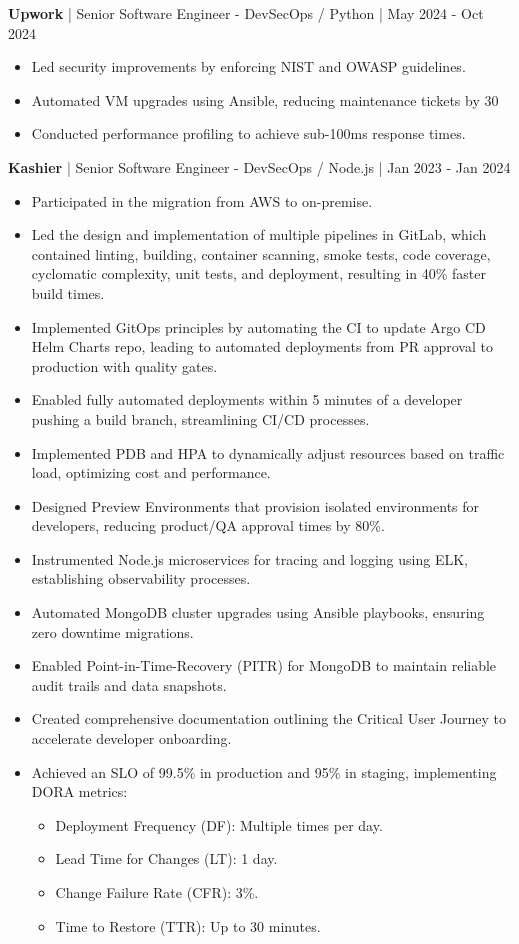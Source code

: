\documentclass{resume} %
\begin{document}
\textbf{Upwork} | Senior Software Engineer - DevSecOps / Python | May 2024 - Oct 2024
\begin{itemize}
    \item Led security improvements by enforcing NIST and OWASP guidelines.
    \item Automated VM upgrades using Ansible, reducing maintenance tickets by 30%
    \item Conducted performance profiling to achieve sub-100ms response times.
\end{itemize}

\textbf{Kashier} | Senior Software Engineer - DevSecOps / Node.js | Jan 2023 - Jan 2024
\begin{itemize}
    \item Participated in the migration from AWS to on-premise.
    \item Led the design and implementation of multiple pipelines in GitLab, which contained linting, building, container scanning, smoke tests, code coverage, cyclomatic complexity, unit tests, and deployment, resulting in 40\% faster build times.
    \item Implemented GitOps principles by automating the CI to update Argo CD Helm Charts repo, leading to automated deployments from PR approval to production with quality gates.
    \item Enabled fully automated deployments within 5 minutes of a developer pushing a build branch, streamlining CI/CD processes.
    \item Implemented PDB and HPA to dynamically adjust resources based on traffic load, optimizing cost and performance.
    \item Designed Preview Environments that provision isolated environments for developers, reducing product/QA approval times by 80\%.
    \item Instrumented Node.js microservices for tracing and logging using ELK, establishing observability processes.
    \item Automated MongoDB cluster upgrades using Ansible playbooks, ensuring zero downtime migrations.
    \item Enabled Point-in-Time-Recovery (PITR) for MongoDB to maintain reliable audit trails and data snapshots.
    \item Created comprehensive documentation outlining the Critical User Journey to accelerate developer onboarding.
    \item Achieved an SLO of 99.5\% in production and 95\% in staging, implementing DORA metrics:
    \begin{itemize}
        \item Deployment Frequency (DF): Multiple times per day.
        \item Lead Time for Changes (LT): 1 day.
        \item Change Failure Rate (CFR): 3\%.
        \item Time to Restore (TTR): Up to 30 minutes.
    \end{itemize}
\end{itemize}
\end{document}
